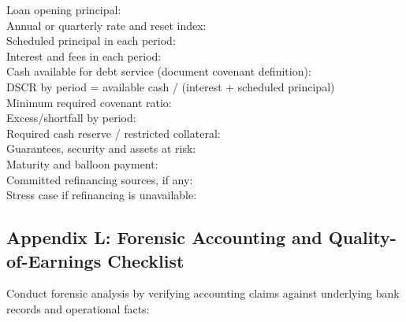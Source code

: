 \begin{tcolorbox}[colback=BayesCanvas,colframe=BayesDark,arc=1mm,title=\textbf{Appendix K: Debt-Service and Refinancing Stress Sheet}]
\scriptsize\ttfamily
Loan opening principal:\\
Annual or quarterly rate and reset index:\\
Scheduled principal in each period:\\
Interest and fees in each period:\\
Cash available for debt service (document covenant definition):\\
DSCR by period = available cash / (interest + scheduled principal)\\
Minimum required covenant ratio:\\
Excess/shortfall by period:\\
Required cash reserve / restricted collateral:\\
Guarantees, security and assets at risk:\\
Maturity and balloon payment:\\
Committed refinancing sources, if any:\\
Stress case if refinancing is unavailable:
\end{tcolorbox}

\subsection{Appendix L: Forensic Accounting and Quality-of-Earnings Checklist}

Conduct forensic analysis by verifying accounting claims against underlying bank records and operational facts:

